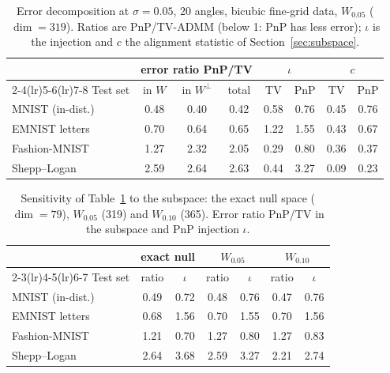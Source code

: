 \begin{table}[htbp]
\centering\small\setlength{\tabcolsep}{4pt}
\caption{Error decomposition at $\sigma=0.05$, 20 angles, bicubic fine-grid data, $W_{0.05}$ ($\dim=319$).
Ratios are PnP/TV-ADMM (below 1: PnP has less error); $\iota$ is the injection and $c$ the alignment statistic of
Section~\ref{sec:subspace}.}\label{tab:nullspace}
\begin{tabular}{lccccccc}
\toprule
 & \multicolumn{3}{c}{error ratio PnP/TV} & \multicolumn{2}{c}{$\iota$} & \multicolumn{2}{c}{$c$}\\
\cmidrule(lr){2-4}\cmidrule(lr){5-6}\cmidrule(lr){7-8}
Test set & in $W$ & in $W^\perp$ & total & TV & PnP & TV & PnP\\
\midrule
MNIST (in-dist.)  & 0.48 & 0.40 & 0.42 & 0.58 & 0.76 & 0.45 & 0.76\\
EMNIST letters    & 0.70 & 0.64 & 0.65 & 1.22 & 1.55 & 0.43 & 0.67\\
Fashion-MNIST     & 1.27 & 2.32 & 2.05 & 0.29 & 0.80 & 0.36 & 0.37\\
Shepp--Logan      & 2.59 & 2.64 & 2.63 & 0.44 & 3.27 & 0.09 & 0.23\\
\bottomrule
\end{tabular}
\end{table}

\begin{table}[htbp]
\centering\small\setlength{\tabcolsep}{4pt}
\caption{Sensitivity of Table~\ref{tab:nullspace} to the subspace: the exact null space ($\dim=79$), $W_{0.05}$ (319) and $W_{0.10}$ (365). Error ratio PnP/TV in the subspace and PnP injection $\iota$.}\label{tab:nullspace-tau}
\begin{tabular}{lcccccc}
\toprule
 & \multicolumn{2}{c}{exact null} & \multicolumn{2}{c}{$W_{0.05}$} & \multicolumn{2}{c}{$W_{0.10}$}\\
\cmidrule(lr){2-3}\cmidrule(lr){4-5}\cmidrule(lr){6-7}
Test set & ratio & $\iota$ & ratio & $\iota$ & ratio & $\iota$\\
\midrule
MNIST (in-dist.) & 0.49 & 0.72 & 0.48 & 0.76 & 0.47 & 0.76\\
EMNIST letters   & 0.68 & 1.56 & 0.70 & 1.55 & 0.70 & 1.56\\
Fashion-MNIST    & 1.21 & 0.70 & 1.27 & 0.80 & 1.27 & 0.83\\
Shepp--Logan     & 2.64 & 3.68 & 2.59 & 3.27 & 2.21 & 2.74\\
\bottomrule
\end{tabular}
\end{table}

